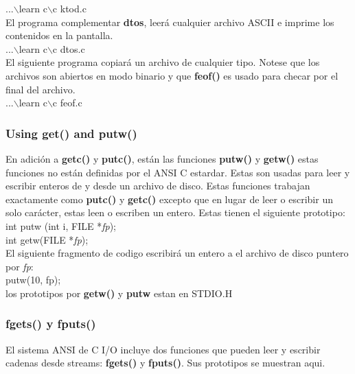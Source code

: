 \documentclass[]{article}
\begin{document}
	...$\backslash$learn c$\backslash$c ktod.c\\
	
	El programa complementar \textbf{dtos}, leerá cualquier archivo ASCII e imprime los contenidos en la pantalla.\\
	
	...$\backslash$learn c$\backslash$c dtos.c\\
	
	El siguiente programa copiará un archivo de cualquier tipo. Notese que los archivos son abiertos en modo binario y que \textbf{feof()} es usado para checar por el final del archivo.\\
	
	...$\backslash$learn c$\backslash$c feof.c\\
	
	\subsubsection{Using get() and putw()}
	
	En adición a \textbf{getc()} y \textbf{putc()}, están las funciones \textbf{putw()} y \textbf{getw()} estas funciones no están definidas por el ANSI C estardar. Estas son usadas para leer y escribir enteros de y desde un archivo de disco. Estas funciones trabajan exactamente como \textbf{putc()} y \textbf{getc()} excepto que en lugar de leer o escribir un solo carácter, estas leen o escriben un entero. Estas tienen el siguiente prototipo:\\
	
	int putw (int i, FILE *\textit{fp});\\
	
	int getw(FILE *\textit{fp});\\
	
	El siguiente fragmento de codigo escribirá un entero a el archivo de disco puntero por \textit{fp}:\\
	
	putw(10, fp);\\
	
	los prototipos por \textbf{getw()} y \textbf{putw} estan en STDIO.H\\
	
	\subsubsection{fgets() y fputs()}
	
	El sistema ANSI de C I/O incluye dos funciones que pueden leer y escribir cadenas desde streams: \textbf{fgets()} y \textbf{fputs()}. Sus prototipos se muestran aqui.\\
	
\end{document}
